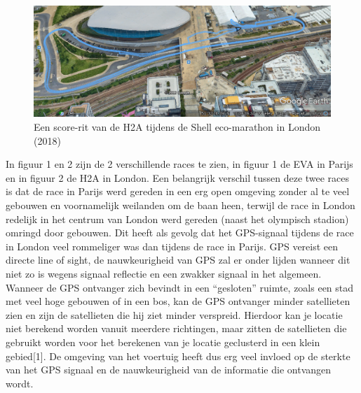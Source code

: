 \documentclass[a4paper, 11pt]{article} %
\begin{document}
\begin{figure}[h!]
	\centering
	\includegraphics[width=15cm]{afbeeldingen/Londontest.png}
	\caption{Een score-rit van de H2A tijdens de Shell eco-marathon in London (2018)}
\end{figure}
\newpage
In figuur 1 en 2 zijn de 2 verschillende races te zien, in figuur 1 de EVA in Parijs en in figuur 2 de H2A in London. Een belangrijk verschil tussen deze twee races is dat de race in Parijs werd gereden in een erg open omgeving zonder al te veel gebouwen en voornamelijk weilanden om de baan heen, terwijl de race in London redelijk in het centrum van London werd gereden (naast het olympisch stadion) omringd door gebouwen. Dit heeft als gevolg dat het GPS-signaal tijdens de race in London veel rommeliger was dan tijdens de race in Parijs. GPS vereist een directe line of sight, de nauwkeurigheid van GPS zal er onder lijden wanneer dit niet zo is wegens signaal reflectie en een zwakker signaal in het algemeen. Wanneer de GPS ontvanger zich bevindt in een “gesloten” ruimte, zoals een stad met veel hoge gebouwen of in een bos, kan de GPS ontvanger minder satellieten zien en zijn de satellieten die hij ziet minder verspreid. Hierdoor kan je locatie niet berekend worden vanuit meerdere richtingen, maar zitten de satellieten die gebruikt worden voor het berekenen van je locatie geclusterd in een klein gebied[1]. De omgeving van het voertuig heeft dus erg veel invloed op de sterkte van het GPS signaal en de nauwkeurigheid van de informatie die ontvangen wordt.
\end{document}
